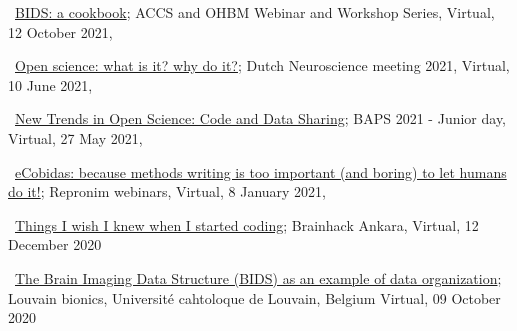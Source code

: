 \textbullet~\href{https://remi-gau.github.io/bids_cookbook/}{BIDS: a cookbook};
ACCS and OHBM Webinar and Workshop Series,
Virtual,
12 October 2021,


\textbullet~\href{https://osf.io/ce7tn/}{Open science: what is it? why do it?};
Dutch Neuroscience meeting 2021,
Virtual,
10 June 2021,


\textbullet~\href{https://osf.io/6kzn2/}{New Trends in Open Science: Code and Data Sharing};
BAPS 2021 - Junior day,
Virtual,
27 May 2021,


\textbullet~\href{https://osf.io/fb7tx/}{eCobidas: because methods writing is too important (and boring) to let humans do it!};
Repronim webinars,
Virtual,
8 January 2021,


\textbullet~\href{https://osf.io/vdgua/}{Things I wish I knew when I started coding};
Brainhack Ankara,
Virtual,
12 December 2020


\textbullet~\href{https://osf.io/zf5x8/}{The Brain Imaging Data Structure (BIDS) as an example of data organization};
Louvain bionics, Université cahtoloque de Louvain, Belgium
Virtual,
09 October 2020
